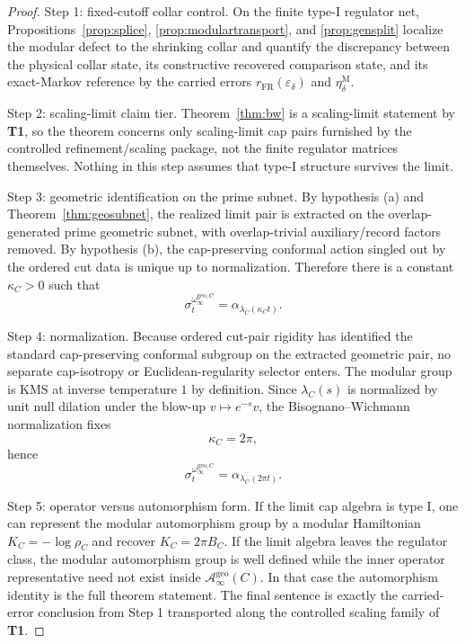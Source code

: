 \documentclass[11pt]{article}
\begin{document}
\begin{proof}
Step 1: fixed-cutoff collar control. On the finite type-I regulator net, Propositions~\ref{prop:splice}, \ref{prop:modulartransport}, and \ref{prop:gensplit} localize the modular defect to the shrinking collar and quantify the discrepancy between the physical collar state, its constructive recovered comparison state, and its exact-Markov reference by the carried errors \(r_{\mathrm{FR}}(\varepsilon_\delta)\) and \(\eta_\delta^{\mathrm M}\).

Step 2: scaling-limit claim tier. Theorem~\ref{thm:bw} is a scaling-limit statement by \textbf{T1}, so the theorem concerns only scaling-limit cap pairs furnished by the controlled refinement/scaling package, not the finite regulator matrices themselves. Nothing in this step assumes that type-I structure survives the limit.

Step 3: geometric identification on the prime subnet. By hypothesis \textup{(a)} and Theorem~\ref{thm:geosubnet}, the realized limit pair is extracted on the overlap-generated prime geometric subnet, with overlap-trivial auxiliary/record factors removed. By hypothesis \textup{(b)}, the cap-preserving conformal action singled out by the ordered cut data is unique up to normalization. Therefore there is a constant \(\kappa_C>0\) such that
\[
\sigma_t^{\omega_\infty^{\mathrm{geo},C}}=\alpha_{\lambda_C(\kappa_C t)}.
\]

Step 4: normalization. Because ordered cut-pair rigidity has identified the standard cap-preserving conformal subgroup on the extracted geometric pair, no separate cap-isotropy or Euclidean-regularity selector enters. The modular group is KMS at inverse temperature \(1\) by definition. Since \(\lambda_C(s)\) is normalized by unit null dilation under the blow-up \(v\mapsto e^{-s}v\), the Bisognano--Wichmann normalization fixes
\[
\kappa_C=2\pi,
\]
hence
\[
\sigma_t^{\omega_\infty^{\mathrm{geo},C}}
=
\alpha_{\lambda_C(2\pi t)}.
\]

Step 5: operator versus automorphism form. If the limit cap algebra is type I, one can represent the modular automorphism group by a modular Hamiltonian \(K_C=-\log\rho_C\) and recover \(K_C=2\pi B_C\). If the limit algebra leaves the regulator class, the modular automorphism group is well defined while the inner operator representative need not exist inside \(\mathcal A_\infty^{\mathrm{geo}}(C)\). In that case the automorphism identity is the full theorem statement. The final sentence is exactly the carried-error conclusion from Step 1 transported along the controlled scaling family of \textbf{T1}.
\end{proof}
\end{document}
